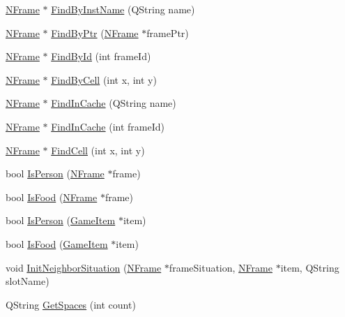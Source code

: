 \begin{DoxyCompactItemize}
\item 
\hyperlink{class_n_frame}{NFrame} $\ast$ \hyperlink{class_m_l_v_af9fa0dd9e5e251e59f2b8a6f530f8b13}{FindByInstName} (QString name)
\item 
\hyperlink{class_n_frame}{NFrame} $\ast$ \hyperlink{class_m_l_v_a030776febc4494da71b892fc2ade5041}{FindByPtr} (\hyperlink{class_n_frame}{NFrame} $\ast$framePtr)
\item 
\hyperlink{class_n_frame}{NFrame} $\ast$ \hyperlink{class_m_l_v_a2c57367ca70fda0976a6e1812cfdc2fe}{FindById} (int frameId)
\item 
\hyperlink{class_n_frame}{NFrame} $\ast$ \hyperlink{class_m_l_v_a4882cb69ab5b9cb7287e4697346996a5}{FindByCell} (int x, int y)
\item 
\hyperlink{class_n_frame}{NFrame} $\ast$ \hyperlink{class_m_l_v_ade7d4990f035acf0c0b81db8efbb0a67}{FindInCache} (QString name)
\item 
\hyperlink{class_n_frame}{NFrame} $\ast$ \hyperlink{class_m_l_v_aae69772e57e654ffa950b41bd2a3672c}{FindInCache} (int frameId)
\item 
\hyperlink{class_n_frame}{NFrame} $\ast$ \hyperlink{class_m_l_v_aa9ee3f2bdcb46f4b7def3c46cbc1e42d}{FindCell} (int x, int y)
\item 
bool \hyperlink{class_m_l_v_aa75ccc4a61c39d3e085f6d15d87fac13}{IsPerson} (\hyperlink{class_n_frame}{NFrame} $\ast$frame)
\item 
bool \hyperlink{class_m_l_v_a971316633bbc7474f17e0a700e836a05}{IsFood} (\hyperlink{class_n_frame}{NFrame} $\ast$frame)
\item 
bool \hyperlink{class_m_l_v_a35189985225a7d5afe5d43b4a87d3400}{IsPerson} (\hyperlink{class_game_item}{GameItem} $\ast$item)
\item 
bool \hyperlink{class_m_l_v_abbb19c02997a9e163eb54eaedd66f353}{IsFood} (\hyperlink{class_game_item}{GameItem} $\ast$item)
\item 
void \hyperlink{class_m_l_v_ab296c8cfa532b38a9f9166a2882943b4}{InitNeighborSituation} (\hyperlink{class_n_frame}{NFrame} $\ast$frameSituation, \hyperlink{class_n_frame}{NFrame} $\ast$item, QString slotName)
\item 
QString \hyperlink{class_m_l_v_a3311dabe98732bc56e57aea9a0b25ba2}{GetSpaces} (int count)
\end{DoxyCompactItemize}
